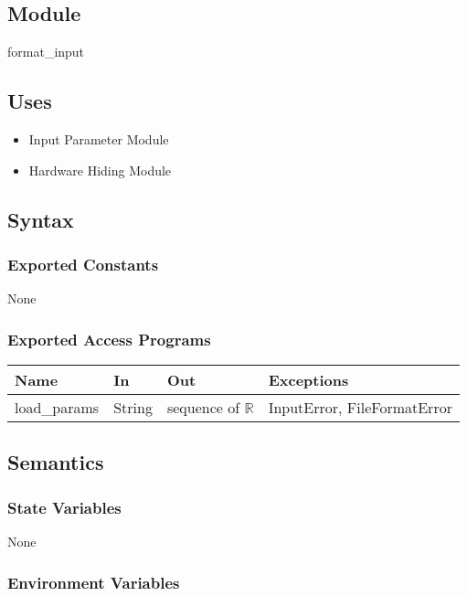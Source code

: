 \documentclass[12pt, titlepage]{article}
\begin{document}
\subsection{Module}

format\_input 

\subsection{Uses}

\begin{itemize}
    \item Input Parameter Module
    \item Hardware Hiding Module
\end{itemize}

\subsection{Syntax}

\subsubsection{Exported Constants}
None 
\subsubsection{Exported Access Programs}

\begin{center}
\begin{tabular}{p{2.5cm} p{3.5cm} p{4cm} p{4cm}}
\hline
\textbf{Name} & \textbf{In} & \textbf{Out} & \textbf{Exceptions} \\
\hline
load\_params & String & sequence of $\mathbb{R}$ & InputError, FileFormatError \\
\hline
\end{tabular}
\end{center}

\subsection{Semantics}

\subsubsection{State Variables}

None

\subsubsection{Environment Variables}
\end{document}

